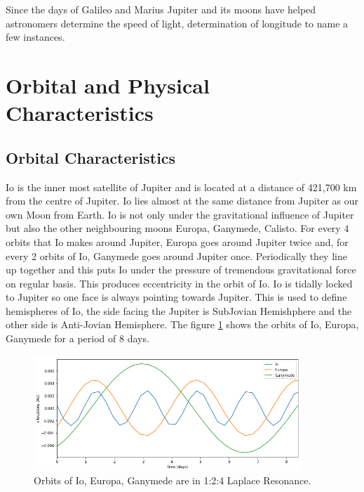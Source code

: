 \documentclass[a4paper,11pt,oneside]{article}
\begin{document}
Since the days of Galileo and Marius Jupiter and its moons have helped astronomers determine the speed of light, determination of longitude to name a few instances.



\section{Orbital and Physical Characteristics}
\subsection{Orbital Characteristics}
Io is the inner most satellite of Jupiter and is located at a distance of 421,700 km from the centre of Jupiter. Io lies almost at the same distance from Jupiter as our own Moon from Earth. Io is not only under the gravitational influence of Jupiter but also the other neighbouring moons Europa, Ganymede, Calisto.  For every 4 orbits that Io makes around Jupiter, Europa goes around Jupiter twice and, for every 2 orbits of Io, Ganymede goes around Jupiter once. Periodically they line up together and this puts Io under the pressure of tremendous gravitational force on regular basis.  This produces eccentricity in the orbit of Io. Io is tidally locked to Jupiter so one face is always pointing towards Jupiter. This is used to define hemispheres of Io, the side facing the Jupiter is SubJovian Hemishphere and the other side is Anti-Jovian Hemisphere. The figure \ref{fig:orbres} shows the orbits of Io, Europa, Ganymede for a period of 8 days. 

 

\begin{figure}[ht]
\centering
\includegraphics[width=0.9\textwidth]{figures/orb-res.png}
\caption{Orbits of Io, Europa, Ganymede are in 1:2:4 Laplace Resonance.}
\label{fig:orbres}
\end{figure}
\end{document}

